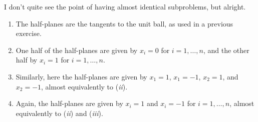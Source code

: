 \begin{solution}
  I don't quite see the point of having almost identical subproblems, but alright.
  \begin{enumerate}[label = (\emph{\roman*})]
    \item The half-planes are the tangents to the unit ball, as used in a previous exercise.
    \item One half of the half-planes are given by $x_i = 0$ for $i = 1, \ldots, n$, and the other half by $x_i = 1$ for $i = 1, \ldots, n$.
    \item Similarly, here the half-planes are given by $x_1 = 1$, $x_1 = -1$, $x_2 = 1$, and $x_2 = -1$, almost equivalently to (\emph{ii}).
    \item Again, the half-planes are given by $x_i = 1$ and $x_i = -1$ for $i = 1, \ldots, n$, almost equivalently to (\emph{ii}) and (\emph{iii}).
  \end{enumerate}
\end{solution}